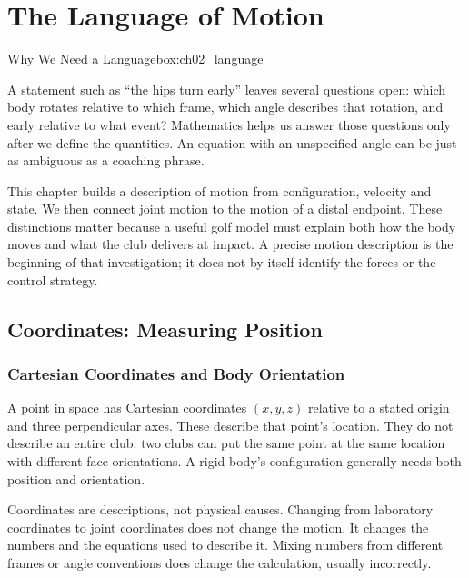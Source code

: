 \chapter{The Language of Motion}\label{ch:02_language_of_motion}

\begin{laymansbox}{Why We Need a Language}{box:ch02_language}

A statement such as ``the hips turn early'' leaves several questions open: which body rotates relative to which frame, which angle describes that rotation, and early relative to what event? Mathematics helps us answer those questions only after we define the quantities. An equation with an unspecified angle can be just as ambiguous as a coaching phrase.

This chapter builds a description of motion from configuration, velocity and state. We then connect joint motion to the motion of a distal endpoint. These distinctions matter because a useful golf model must explain both how the body moves and what the club delivers at impact. A precise motion description is the beginning of that investigation; it does not by itself identify the forces or the control strategy.

\end{laymansbox}

\section{Coordinates: Measuring Position}\label{ch02:coordinates-measuring-position}

\subsection{Cartesian Coordinates and Body Orientation}\label{ch02:cartesian-coordinates-and-body-orientation}

\protect{}\label{ch02:cartesian-coordinates}{}

A point in space has Cartesian coordinates \((x,y,z)\) relative to a stated origin and three perpendicular axes. These describe that point's location. They do not describe an entire club: two clubs can put the same point at the same location with different face orientations. A rigid body's configuration generally needs both position and orientation.

Coordinates are descriptions, not physical causes. Changing from laboratory coordinates to joint coordinates does not change the motion. It changes the numbers and the equations used to describe it. Mixing numbers from different frames or angle conventions does change the calculation, usually incorrectly.

